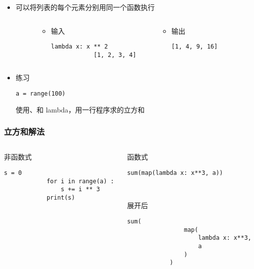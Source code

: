 \begin{frame} [fragile]
	\frametitle{}
	\begin{itemize}
	\item {}可以将列表的每个元素分别用同一个函数执行
	\begin{columns}
		\begin{column}[T]{.1\textwidth}
		\end{column}
		\begin{column}[T]{.4\textwidth}
			\begin{itemize}
			\item 输入
			\begin{lstlisting}[style=pythonstyle, gobble=12, texcl]
			lambda x: x ** 2
			[1, 2, 3, 4]
			\end{lstlisting}
			\end{itemize}
		\end{column}
		\begin{column}[T]{.4\textwidth}
			\begin{itemize}
			\item 输出
			\begin{lstlisting}[style=pythonstyle, gobble=12, texcl]
			[1, 4, 9, 16]
			\end{lstlisting}
			\end{itemize}
		\end{column}
		\begin{column}[T]{.1\textwidth}
		\end{column}
	\end{columns}
	\item 练习
		\begin{lstlisting}[style=pythonstyle, gobble=8, texcl]
		a = range(100)
		\end{lstlisting}
		使用、和\inlinePython
		{lambda}，用一行程序求\inlinePython{a}的立方和
	\end{itemize}
\end{frame}

\begin{frame} [fragile]
	\frametitle{立方和解法}
	\begin{columns}
		\begin{column}[T]{.42\textwidth}
			非函数式
			\begin{lstlisting}[style=pythonstyle, gobble=12, texcl]
			s = 0
			for i in range(a) :
				s += i ** 3
			print(s)
			\end{lstlisting}
		\end{column}
		\begin{column}[T]{.58\textwidth}
			函数式
			\begin{lstlisting}[style=pythonstyle, gobble=12, texcl]
			sum(map(lambda x: x**3, a))
			\end{lstlisting}

			\

			展开后
			\begin{lstlisting}[style=pythonstyle, gobble=12, texcl]
			sum(
				map(
					lambda x: x**3,
					a
				)
			)
			\end{lstlisting}
		\end{column}
	\end{columns}
\end{frame}

